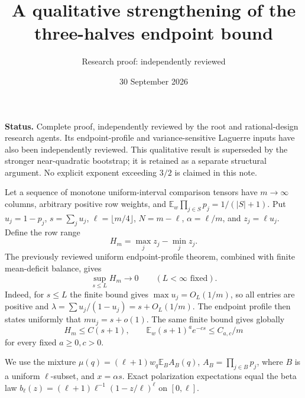 \documentclass[11pt]{article}
\title{A qualitative strengthening of the three-halves endpoint bound}
\author{Research proof: independently reviewed}
\date{30 September 2026}
\newcommand{\E}{\mathbb E}
\begin{document}
\maketitle
\noindent\textbf{Status.} Complete proof, independently reviewed by the root and rational-design
research agents. Its endpoint-profile and variance-sensitive Laguerre
inputs have also been independently reviewed. This qualitative result is
superseded by the stronger near-quadratic bootstrap; it is retained as
a separate structural argument. No explicit exponent exceeding $3/2$
is claimed in this note.

Let a sequence of monotone uniform-interval comparison tensors have
$m\to\infty$ columns, arbitrary positive row weights, and
$\E_w\prod_{j\in S}p_j=1/(|S|+1)$. Put $u_j=1-p_j$, $s=\sum_j u_j$,
$\ell=\lfloor m/4\rfloor$, $N=m-\ell$, $\alpha=\ell/m$, and
$z_j=\ell u_j$. Define the row range
\[
 H_m=\max_j z_j-\min_j z_j.
\]
The previously reviewed uniform endpoint-profile theorem, combined
with finite mean-deficit balance, gives
\begin{equation}\label{profile}
 \sup_{s\le L}H_m\longrightarrow0\qquad(L<\infty\text{ fixed}).
\end{equation}
Indeed, for $s\le L$ the finite bound gives $\max u_j=O_L(1/m)$,
so all entries are positive and $\lambda=\sum u_j/(1-u_j)=s+O_L(1/m)$.
The endpoint profile then states uniformly that $m u_j=s+o(1)$.
The same finite bound gives globally
\begin{equation}\label{global}
 H_m\le C(s+1),\qquad
 \E_w(s+1)^a e^{-cs}\le C_{a,c}/m
\end{equation}
for every fixed $a\ge0,c>0$.

We use the mixture $\mu(q)=(\ell+1)w_q\E_B A_B(q)$,
$A_B=\prod_{j\in B}p_j$, where $B$ is a uniform $\ell$-subset, and
$x=\alpha s$. Exact polarization expectations equal the beta law
$b_\ell(z)=(\ell+1)\ell^{-1}(1-z/\ell)^\ell$ on $[0,\ell]$.
\end{document}
